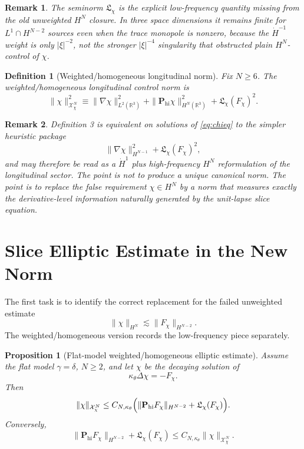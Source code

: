 \documentclass[11pt]{article}
\newtheorem{definition}{Definition}
\newtheorem{proposition}{Proposition}
\newtheorem{remark}{Remark}
\begin{document}
\begin{remark}
The seminorm \(\mathfrak L_\chi\) is the explicit low-frequency quantity missing from the old unweighted \(H^N\) closure. In three space dimensions it remains finite for \(L^1\cap H^{N-2}\) sources even when the trace monopole is nonzero, because the \(\dot H^{-1}\) weight is only \(|\xi|^{-2}\), not the stronger \(|\xi|^{-4}\) singularity that obstructed plain \(H^N\)-control of \(\chi\).
\end{remark}

\begin{definition}[Weighted/homogeneous longitudinal norm]
Fix \(N\ge 6\). The \emph{weighted/homogeneous longitudinal control norm} is
\begin{equation}
\|\chi\|_{\mathcal X_\chi^N}^2
\equiv
\|\nabla\chi\|_{L^2(\mathbb R^3)}^2
+ \|\mathbf P_{\mathrm{hi}}\chi\|_{H^N(\mathbb R^3)}^2
+ \mathfrak L_\chi(F_\chi)^2.
\label{eq:Xchi}
\end{equation}
\end{definition}

\begin{remark}
Definition 3 is equivalent on solutions of \eqref{eq:chieq} to the simpler heuristic package
\[
\|\nabla\chi\|_{H^{N-1}}^2 + \mathfrak L_\chi(F_\chi)^2,
\]
and may therefore be read as a \(\dot H^1\) plus high-frequency \(H^N\) reformulation of the longitudinal sector. The point is not to produce a unique canonical norm. The point is to replace the false requirement \(\chi\in H^N\) by a norm that measures exactly the derivative-level information naturally generated by the unit-lapse slice equation.
\end{remark}

\section{Slice Elliptic Estimate in the New Norm}

The first task is to identify the correct replacement for the failed unweighted estimate
\[
\|\chi\|_{H^N}\lesssim \|F_\chi\|_{H^{N-2}}.
\]
The weighted/homogeneous version records the low-frequency piece separately.

\begin{proposition}[Flat-model weighted/homogeneous elliptic estimate]
\label{prop:flatell}
Assume the flat model \(\gamma=\delta\), \(N\ge 2\), and let \(\chi\) be the decaying solution of
\begin{equation}
\kappa_\theta \Delta \chi = -F_\chi.
\label{eq:flatpoisson}
\end{equation}
Then
\begin{equation}
\|\chi\|_{\mathcal X_\chi^N}
\le
C_{N,\kappa_\theta}
\Bigl(
\|\mathbf P_{\mathrm{hi}}F_\chi\|_{H^{N-2}}
+ \mathfrak L_\chi(F_\chi)
\Bigr).
\label{eq:flatestimate}
\end{equation}
Conversely,
\begin{equation}
\|\mathbf P_{\mathrm{hi}}F_\chi\|_{H^{N-2}}
+ \mathfrak L_\chi(F_\chi)
\le
C_{N,\kappa_\theta}
\|\chi\|_{\mathcal X_\chi^N}.
\label{eq:flatestimate2}
\end{equation}
\end{proposition}
\end{document}
